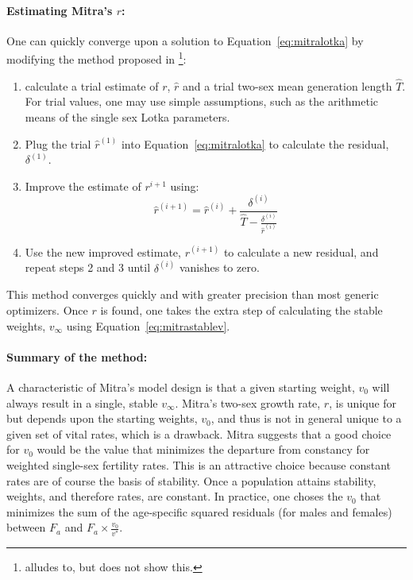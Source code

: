 \paragraph{Estimating Mitra's $r$: } One can quickly converge upon a solution
to Equation~\eqref{eq:mitralotka} by modifying the method proposed in
\citet{coale1957new}\footnote{\citet{mitra1978derivation} alludes to, but does not show this.}:
\begin{enumerate}
  \item calculate a trial estimate of $r$,
$\widehat{r}$ and a trial two-sex mean generation length
$\widehat{T}$. For trial values, one may use simple
assumptions, such as the arithmetic means of the single sex Lotka parameters.
  \item Plug the trial $\widehat{r}^{(1)}$ into Equation~\eqref{eq:mitralotka}
  to calculate the residual, $\delta ^{(1)}$.
  \item Improve the estimate of $r^{i+1}$ using:
  \begin{equation}
  \widehat{r}^{(i+1)} = \widehat{r}^{(i)} + \frac{\delta^{(i)}}{\widehat{T} -
\frac{\delta ^{(i)}}{\widehat{r}^{(i)} }}
  \end{equation}
  \item Use the new improved estimate, $r^{(i+1)}$ to calculate a new residual,
  and repeat steps 2 and 3 until $\delta^{(i)}$ vanishes to zero.
\end{enumerate}

This method converges quickly and with greater precision than most
generic optimizers. Once $r$ is found, one takes the extra step of calculating
the stable weights, $v_\infty$ using Equation~\eqref{eq:mitrastablev}.

\paragraph{Summary of the method: } A characteristic of Mitra's model design is
that a given starting weight, $v_0$ will always result in a single, stable $v_\infty$. 
Mitra's two-sex growth rate,
$r$, is unique for but depends upon the starting weights, $v_0$, and thus is not 
in general unique to a given set of vital rates, which is a drawback. Mitra
suggests that a good choice for $v_0$ would be the value that minimizes the 
departure from constancy for weighted single-sex fertility rates. This is an 
attractive choice because constant rates are of course the
basis of stability. Once a population attains stability, weights, and therefore 
rates, are constant. In practice, one choses the $v_0$ that minimizes the sum of
the age-specific squared residuals (for males and females) between $F_a$ and 
$F_a \times \tfrac{v_0}{v^\ast}$.

